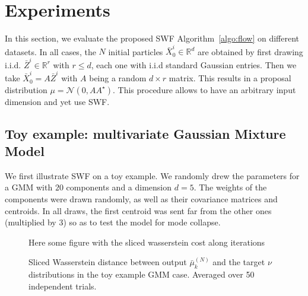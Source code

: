 
\section{Experiments}

In this section, we evaluate the proposed SWF Algorithm~\ref{algo:flow} on different datasets. In all cases, the $N$ initial particles $\bar{X}^i_0\in\mathbb{R}^d$ are obtained by first drawing i.i.d. $\bar{Z}^i\in\mathbb{R}^r$ with $r\leq d$, each one with i.i.d standard Gaussian entries. Then we take $\bar{X}^i_0=A\bar{Z}^i$ with $A$ being a random $d\times r$ matrix. This results in a proposal distribution $\mu=\mathcal{N}(0,AA^\star)$. This procedure allows to have an arbitrary input dimension and yet use SWF.

\subsection{Toy example: multivariate Gaussian Mixture Model}
\label{sub:toy_example}

We first illustrate SWF on a toy example. We randomly drew the parameters for a GMM with $20$ components and a dimension $d=5$. The weights of the components were drawn randomly, as well as their covariance matrices and centroids. In all draws, the first centroid was sent far from the other ones (multiplied by $3$) so as to test the model for mode collapse.

\begin{figure}
\begin{centering}
  Here some figure with the sliced wasserstein cost along iterations
\par\end{centering}
\caption{Sliced Wasserstein distance between output $\bar{\mu}_{k}^{(N)}$ and the target $\nu$ distributions in the toy example GMM case. Averaged over 50 independent trials.\label{fig:toy_sw}}
\end{figure}

